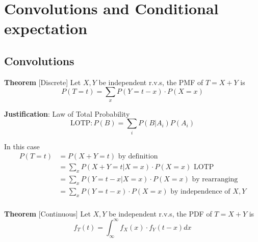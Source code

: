 \chapter{Convolutions and Conditional expectation}

\section{Convolutions}

\begin{framed}
   \textbf{Theorem} [Discrete] Let $X, Y$ be independent r.v.s, the PMF of $T = X + Y$ is 
   \[
      P(T = t) =  \sum_{x} P(Y = t - x) \cdot P(X = x)
   \] 

   \textbf{Justification}: Law of Total Probability
   \[
      \text{LOTP}: P(B) = \sum_{i}P(B | A_i) P(A_i)
   \] 

   In this case
   \begin{align*}
      P(T = t) &= P(X + Y = t) \text{ by definition} \\
               &= \sum_{x} P( X + Y = t | X = x) \cdot P(X = x)  \text{ LOTP} \\
               &= \sum_{x}P( Y = t - x | X = x) \cdot P( X = x)  \text{ by rearranging}\\
               &= \sum_{x}P( Y = t - x ) \cdot P( X = x) \text{ by independence of $X, Y$}\\ 
   \end{align*}
\end{framed}

\begin{framed}
   \textbf{Theorem} [Continuous] Let $X, Y$ be independent r.v.s, the PDF of $T = X + Y$ is
    \[
     f_T(t) = \int_{\infty}^{\infty}  f_X(x) \cdot f_Y(t - x) dx 
   \] 
  
\end{framed}

